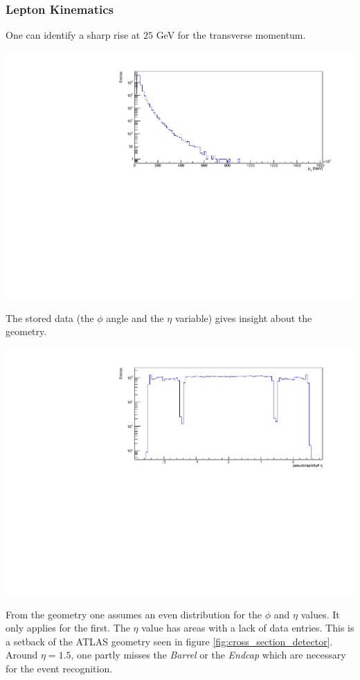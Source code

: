 \documentclass[12pt, a4paper, bibliography=totoc]{scrartcl}
\begin{document}
\begin{multicols}{2}
\subsubsection{Lepton Kinematics}
One can identify a sharp rise at $25$ \si{GeV} for the transverse momentum. 
\begin{center}
    \includegraphics[width=0.8\linewidth]{fig/p_T_final.pdf}
\end{center}    
The stored data (the $\phi$ angle and the $\eta$ variable) gives insight about the geometry.
\begin{center}
    \includegraphics[width=0.8\linewidth]{fig/eta_final.pdf}
\end{center}
From the geometry one assumes an even distribution for the $\phi$ and $\eta$ values.
It only applies for the first. 
The $\eta$ value has areas with a lack of data entries. 
This is a setback of the ATLAS geometry seen in figure \ref{fig:cross_section_detector}. 
Around $\eta = 1.5$, one partly misses the \textit{Barrel} or the \textit{Endcap} which are necessary for the event recognition. 


\end{multicols}
\end{document}

